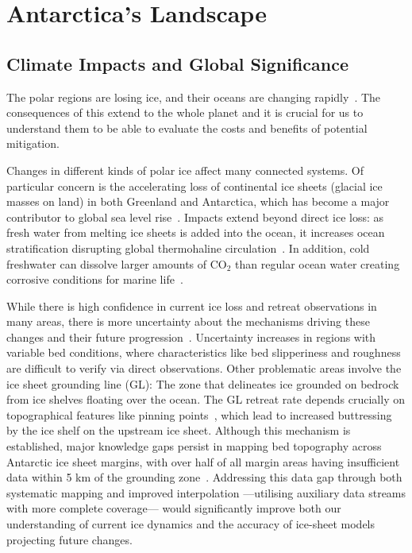 \chapter{Antarctica's Landscape}\label{why}
\section{Climate Impacts and Global Significance}

The polar regions are losing ice, and their oceans are changing rapidly~\cite{O_C_in_changingClimate}. The consequences of this extend to the whole planet and it is crucial for us to understand them to be able to evaluate the costs and benefits of potential mitigation. 

Changes in different kinds of polar ice affect many connected systems. Of particular concern is the accelerating loss of continental ice sheets (glacial ice masses on land) in both Greenland and Antarctica, which has become a major contributor to global sea level rise~\cite{O_C_in_changingClimate}. Impacts extend beyond direct ice loss: as fresh water from melting ice sheets is added into the ocean, it increases ocean stratification disrupting global thermohaline circulation~\cite{Jacobs_2004}. In addition, cold freshwater can dissolve larger amounts of $\mathrm{CO_2}$ than regular ocean water creating corrosive conditions for marine life~\cite{O_C_in_changingClimate}.
 
While there is high confidence in current ice loss and retreat observations in many areas, there is more uncertainty about the mechanisms driving these changes and their future progression~\cite{Fox-Kemper_2021}. Uncertainty increases in regions with variable bed conditions, where characteristics like bed slipperiness and roughness are difficult to verify via direct observations. Other problematic areas involve the ice sheet grounding line (GL): The zone that delineates ice grounded on bedrock from ice shelves floating over the ocean. The GL retreat rate depends crucially on topographical features like pinning points~\cite{Fox-Kemper_2021}, which lead to increased buttressing by the ice shelf on the upstream ice sheet. Although this mechanism is established, major knowledge gaps persist in mapping bed topography across Antarctic ice sheet margins, with over half of all margin areas having insufficient data within 5 km of the grounding zone~\cite{RINGS_2022}. Addressing this data gap through both systematic mapping and improved interpolation —utilising auxiliary data streams with more complete coverage— would significantly improve both our understanding of current ice dynamics and the accuracy of ice-sheet models projecting future changes.


